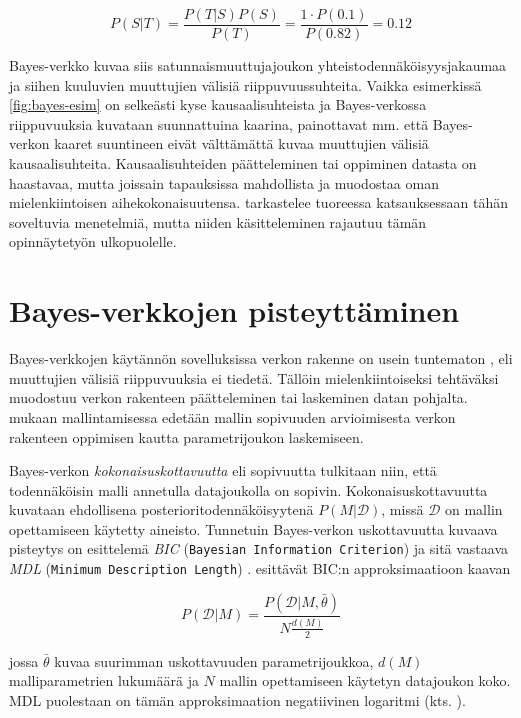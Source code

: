 $$
  P(S|T) = \frac{P(T|S)P(S)}{P(T)} = \frac{1 \cdot P(0.1)}{P(0.82)} = 0.12   
$$

Bayes-verkko kuvaa siis satunnaismuuttujajoukon yhteistodennäköisyysjakaumaa ja siihen kuuluvien muuttujien välisiä riippuvuussuhteita. Vaikka esimerkissä \ref{fig:bayes-esim} on selkeästi kyse kausaalisuhteista ja Bayes-verkossa riippuvuuksia kuvataan suunnattuina kaarina, painottavat mm. \citet{ruggeri_bayesian_2008, myllymaki_bayes-verkkojen_1998} että Bayes-verkon kaaret suuntineen eivät välttämättä kuvaa muuttujien välisiä kausaalisuhteita. Kausaalisuhteiden päätteleminen tai oppiminen datasta on haastavaa, mutta joissain tapauksissa mahdollista ja muodostaa oman mielenkiintoisen aihekokonaisuutensa. \citet{vowels_dya_2022} tarkastelee tuoreessa katsauksessaan tähän soveltuvia menetelmiä, mutta niiden käsitteleminen rajautuu tämän opinnäytetyön ulkopuolelle.

\section{Bayes-verkkojen pisteyttäminen}

Bayes-verkkojen käytännön sovelluksissa verkon rakenne on usein tuntematon \citep{ruggeri_bayesian_2008}, eli muuttujien välisiä riippuvuuksia ei tiedetä. Tällöin mielenkiintoiseksi tehtäväksi muodostuu verkon rakenteen päätteleminen tai laskeminen datan pohjalta. \citet{myllymaki_bayes-verkkojen_1998} mukaan mallintamisessa edetään mallin sopivuuden arvioimisesta verkon rakenteen oppimisen kautta parametrijoukon laskemiseen. 

Bayes-verkon \emph{kokonaisuskottavuutta} eli sopivuutta \citep{myllymaki_bayes-verkkojen_1998} tulkitaan niin, että todennäköisin malli annetulla datajoukolla on sopivin. Kokonaisuskottavuutta kuvataan ehdollisena posterioritodennäköisyytenä $P(M | \mathcal{D})$, missä $\mathcal{D}$ on mallin opettamiseen käytetty aineisto. Tunnetuin Bayes-verkon uskottavuutta kuvaava pisteytys on \citet{schwarz_estimating_1978} esittelemä \emph{BIC} (\texttt{Bayesian Information Criterion}) ja sitä vastaava \emph{MDL} (\texttt{Minimum Description Length}) \citep{ruggeri_bayesian_2008, liu_empirical_2012}. \citet{myllymaki_bayes-verkkojen_1998} esittävät BIC:n approksimaatioon kaavan

$$
P(\mathcal{D}|M) = \frac{P(\mathcal{D}|M, \bar{\theta})}{N{\frac{d(M)}{2}}}
$$

jossa $\bar{\theta}$ kuvaa suurimman uskottavuuden parametrijoukkoa, $d(M)$ malliparametrien lukumäärä ja $N$ mallin opettamiseen käytetyn datajoukon koko. MDL puolestaan on tämän approksimaation negatiivinen logaritmi (kts. \citet{rissanen_stochastic_1987}).

